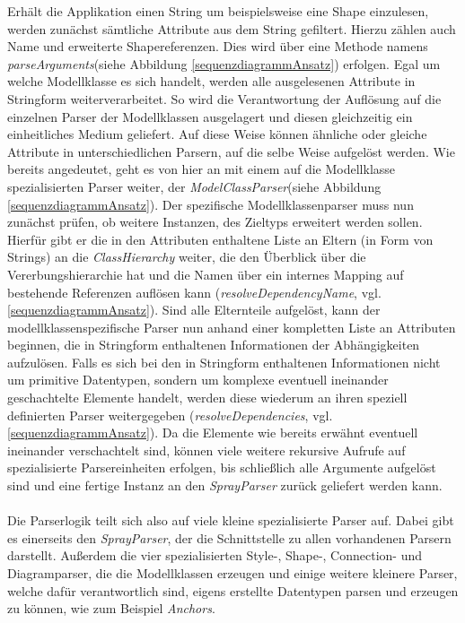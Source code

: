 \begin{figure}[htb]
\end{figure}Erhält die Applikation einen String um beispielsweise eine Shape einzulesen, werden zunächst sämtliche Attribute aus dem String gefiltert. Hierzu zählen auch Name und erweiterte Shapereferenzen. Dies wird über eine Methode namens \textit{parseArguments}(siehe Abbildung \ref{sequenzdiagrammAnsatz}) erfolgen. Egal um welche Modellklasse es sich handelt, werden alle ausgelesenen Attribute in Stringform weiterverarbeitet. So wird die Verantwortung der Auflösung auf die einzelnen Parser der Modellklassen ausgelagert und diesen gleichzeitig ein einheitliches Medium geliefert. Auf diese Weise können ähnliche oder gleiche Attribute in unterschiedlichen Parsern, auf die selbe Weise aufgelöst werden. Wie bereits angedeutet, geht es von hier an mit einem auf die Modellklasse spezialisierten Parser weiter, der \textit{ModelClassParser}(siehe Abbildung \ref{sequenzdiagrammAnsatz}). Der spezifische Modellklassenparser muss nun zunächst prüfen, ob weitere Instanzen, des Zieltyps erweitert werden sollen. Hierfür gibt er die in den Attributen enthaltene Liste an Eltern (in Form von Strings) an die \textit{ClassHierarchy} weiter, die den Überblick über die Vererbungshierarchie hat und die Namen über ein internes Mapping auf bestehende Referenzen auflösen kann (\textit{resolveDependencyName}, vgl. \ref{sequenzdiagrammAnsatz}). Sind alle Elternteile aufgelöst, kann der modellklassenspezifische Parser nun anhand einer kompletten Liste an Attributen beginnen, die in Stringform enthaltenen Informationen der Abhängigkeiten aufzulösen.
Falls es sich bei den in Stringform enthaltenen Informationen nicht um primitive Datentypen, sondern um komplexe eventuell ineinander geschachtelte Elemente handelt, werden diese wiederum an ihren speziell definierten Parser weitergegeben (\textit{resolveDependencies}, vgl. \ref{sequenzdiagrammAnsatz}). Da die Elemente wie bereits erwähnt eventuell ineinander verschachtelt sind, können viele weitere rekursive Aufrufe auf spezialisierte Parsereinheiten erfolgen, bis schließlich alle Argumente aufgelöst sind und eine fertige Instanz an den \textit{SprayParser} zurück geliefert werden kann.\\\\Die Parserlogik teilt sich also auf viele kleine spezialisierte Parser auf. Dabei gibt es einerseits den \textit{SprayParser}, der die Schnittstelle zu allen vorhandenen Parsern darstellt. Außerdem die vier spezialisierten Style-, Shape-, Connection- und Diagramparser, die die Modellklassen erzeugen und einige weitere kleinere Parser, welche dafür verantwortlich sind, eigens erstellte Datentypen parsen und erzeugen zu können, wie zum Beispiel \textit{Anchors}. 
